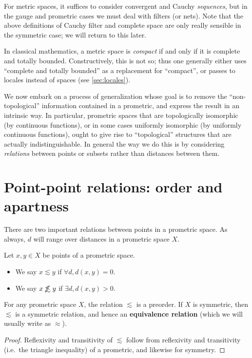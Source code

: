 \documentclass{article}
\def\oapt{\mathrel{\!\not\,\not\lesssim}}
\def\leapx{\lesssim}
\begin{document}
For metric spaces, it suffices to consider convergent and Cauchy \emph{sequences}, but in the gauge and prometric cases we must deal with filters (or nets).
Note that the above definitions of Cauchy filter and complete space are only really sensible in the symmetric case; we will return to this later.

In classical mathematics, a metric space is \emph{compact} if and only if it is complete and totally bounded.
Constructively, this is not so; thus one generally either uses ``complete and totally bounded'' as a replacement for ``compact'', or passes to locales instead of spaces (see \cref{sec:locales}).


We now embark on a process of generalization whose goal is to remove the ``non-topological'' information contained in a prometric, and express the result in an intrinsic way.
In particular, prometric spaces that are topologically isomorphic (by continuous functions), or in some cases uniformly isomorphic (by uniformly continuous functions), ought to give rise to ``topological'' structures that are actually indistinguishable.
In general the way we do this is by considering \emph{relations} between points or subsets rather than distances between them.


\section{Point-point relations: order and apartness}
\label{sec:point-point}
\label{sec:order}

There are two important relations between points in a prometric space.
As always, $d$ will range over distances in a prometric space $X$.

\begin{defn}\label{def:promet-ord}
  Let $x,y\in X$ be points of a prometric space.
  \begin{itemize}
  \item We say $x\leapx y$ if $\forall d, d(x,y)=0$.
  \item We say $x\oapt y$ if $\exists d, d(x,y)>0$.
  \end{itemize}
\end{defn}

\begin{thm}
  For any prometric space $X$, the relation $\leapx$ is a preorder.
  If $X$ is symmetric, then $\leapx$ is a symmetric relation, and hence an \textbf{equivalence relation} (which we will usually write as $\approx$).
\end{thm}
\begin{proof}
  Reflexivity and transitivity of $\leapx$ follow from reflexivity and transitivity (i.e.\ the triangle inequality) of a prometric, and likewise for symmetry.
\end{proof}
\end{document}
